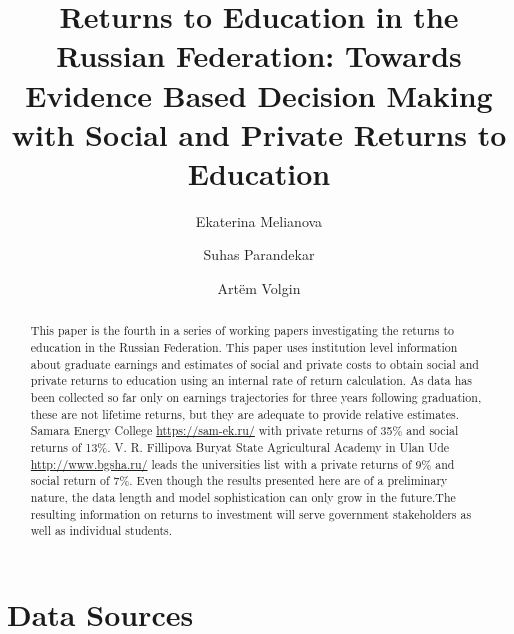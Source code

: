 \documentclass[alpha-refs]{wiley-article-05g}
\title{Returns to Education in the Russian Federation: Towards Evidence Based Decision Making with Social and Private Returns to Education}
\author[*]{Ekaterina Melianova}
\author[*]{\hspace{-1em}Suhas Parandekar}
\author[*]{\hspace{-1em}Art\"{e}m Volgin}
\affil[*]{Education Global Practice, Europe and Central Asia}
\begin{document}
	
\setcounter{page}{76} 

\maketitle

\begin{abstract}
\vspace{.5em}
This paper is the fourth in a series of working papers investigating the 
returns to education in the Russian Federation. This paper uses institution 
level information about graduate earnings and estimates of social and 
private costs to obtain social and private returns to education using an 
internal rate of return calculation. As data has been collected so far only 
on earnings trajectories for three years following graduation, these are 
not lifetime returns, but they are adequate to provide relative estimates. 
Samara Energy College \url{https://sam-ek.ru/} with private returns of 35\% 
and social returns of 13\%. V. R. Fillipova Buryat State Agricultural 
Academy in Ulan Ude \url{http://www.bgsha.ru/} leads the universities list 
with a private returns of 9\% and social return of 7\%. Even though the 
results presented here are of a preliminary nature, the data length and 
model sophistication can only grow in the future.The resulting information 
on returns to investment will serve government stakeholders as well as 
individual students.  

\end{abstract}

\section{Data Sources}
\end{document}
